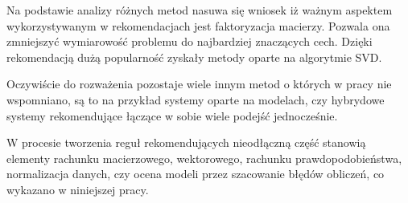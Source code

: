 \documentclass[12pt,a4paper]{report}
\begin{document}
Na podstawie analizy różnych metod nasuwa się wniosek iż ważnym aspektem wykorzystywanym w rekomendacjach jest faktoryzacja macierzy. Pozwala ona zmniejszyć wymiarowość problemu do najbardziej znaczących cech. Dzięki rekomendacją dużą popularność zyskały metody oparte na algorytmie SVD.

Oczywiście do rozważenia pozostaje wiele innym metod o których w pracy nie wspomniano, są to na przykład systemy oparte na modelach, czy hybrydowe systemy rekomendujące łączące w sobie wiele podejść jednocześnie.

W procesie tworzenia reguł rekomendujących nieodłączną część stanowią elementy rachunku macierzowego, wektorowego, rachunku prawdopodobieństwa, normalizacja danych, czy ocena modeli przez szacowanie błędów obliczeń, co wykazano w niniejszej pracy. 




\end{document}
